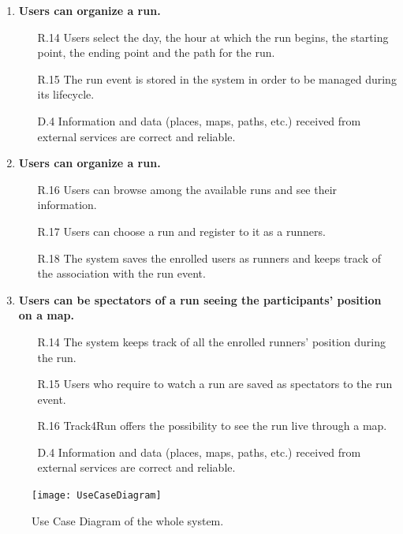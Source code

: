 \documentclass[a4paper]{article}
\begin{document}
\begin{enumerate}[label*=\bf{G.\arabic*}]
    \item \textbf{Users can organize a run.}
    
    \begin{enumerate}
        \item [R.14] Users select the day, the hour at which the run begins, the starting point, the ending point and the path for the run.
        \item [R.15] The run event is stored in the system in order to be managed during its lifecycle.
        \item [D.4] Information and data (places, maps, paths, etc.) received from external services are correct and reliable.
    \end{enumerate}
    
    \item \textbf{Users can organize a run.}
    
    \begin{enumerate}
        \item [R.16] Users can browse among the available runs and see their information.
        \item [R.17] Users can choose a run and register to it as a runners.
        \item [R.18] The system saves the enrolled users as runners and keeps track of the association with the run event.
    \end{enumerate}
    
    \item \textbf{Users can be spectators of a run seeing the participants' position on a map.}
    
    \begin{enumerate}
        \item [R.14] The system keeps track of all the enrolled runners' position during the run.
        \item [R.15] Users who require to watch a run are saved as spectators to the run event.
        \item [R.16] Track4Run offers the possibility to see the run live through a map.
        \item [D.4] Information and data (places, maps, paths, etc.) received from external services are correct and reliable.
    \end{enumerate}
    
\end{enumerate}
\clearpage

\begin{figure}
    \centering
    \texttt{[image: UseCaseDiagram]}
    \caption{Use Case Diagram of the whole system.}
    \label{fig:my_label}
\end{figure}
\end{document}
